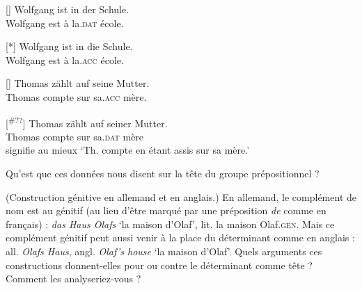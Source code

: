 {    \begin{exe}
    []{
    \gll   Wolfgang ist in der Schule.\\
    Wolfgang est à la.\textsc{dat} école.\\}

    [*]{
    \gll   Wolfgang ist in die Schule. \\
    Wolfgang est à la.\textsc{acc} école.\\}

    []{
    \gll Thomas zählt auf seine Mutter.\\
    Thomas compte sur sa.\textsc{acc} mère.\\}

    [\textsuperscript{\#??}]{
    \gll Thomas zählt auf seiner Mutter.\\
    Thomas compte sur sa.\textsc{dat} mère \\
    \glt    signifie au mieux ‘Th. compte en étant assis sur sa mère.’}
    \end{exe}

    \noindent Qu’est que ces données nous disent sur la tête du groupe prépositionnel ?

     ({Construction génitive en allemand et en anglais.}) En allemand, le complément de nom est au génitif (au lieu d’être marqué par une préposition \textit{de} comme en français) : \textit{das Haus Olafs} ‘la maison d’Olaf’, lit. la maison Olaf.\textsc{gen}. Mais ce complément génitif peut aussi venir à la place du déterminant comme en anglais : all. \textit{Olafs Haus}, angl. \textit{Olaf’s house} ‘la maison d’Olaf’. Quels arguments ces constructions donnent-elles pour ou contre le déterminant comme tête ? Comment les analyseriez-vous ?
}
